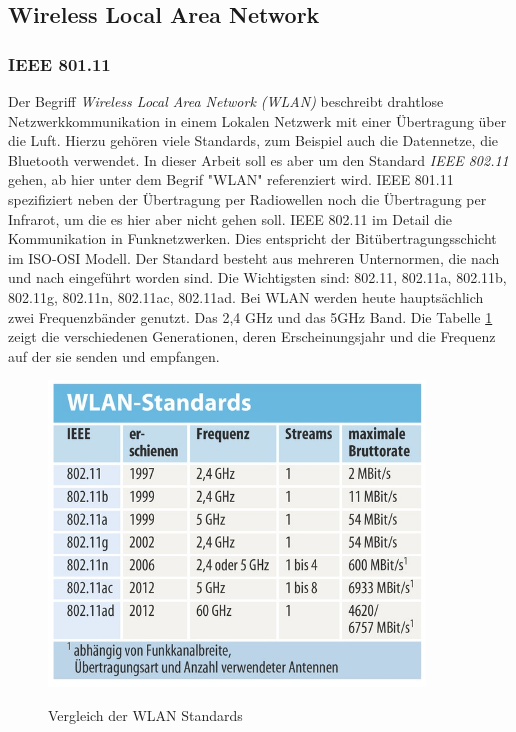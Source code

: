 \documentclass{scrartcl}%
\begin{document}
\subsection{Wireless Local Area Network}
\subsubsection{IEEE 801.11}
Der Begriff \textit{Wireless Local Area Network (WLAN)} beschreibt drahtlose Netzwerkkommunikation in einem Lokalen Netzwerk mit einer Übertragung über die Luft. Hierzu gehören viele Standards, zum Beispiel auch die Datennetze, die Bluetooth verwendet. In dieser Arbeit soll es aber um den Standard \textit{IEEE 802.11} gehen, ab hier unter dem Begrif "WLAN" referenziert wird. IEEE 801.11 spezifiziert neben der Übertragung per Radiowellen noch die Übertragung per Infrarot, um die es hier aber nicht gehen soll. IEEE 802.11 im Detail die Kommunikation in Funknetzwerken. Dies entspricht der Bitübertragungsschicht im ISO-OSI Modell. Der Standard besteht aus mehreren Unternormen, die nach und nach eingeführt worden sind. Die Wichtigsten sind:  802.11, 802.11a, 802.11b, 802.11g, 802.11n, 802.11ac, 802.11ad. Bei WLAN werden heute hauptsächlich zwei Frequenzbänder genutzt. Das 2,4 GHz und das 5GHz Band. Die Tabelle \ref{wlanStandards} zeigt die verschiedenen Generationen, deren Erscheinungsjahr und die Frequenz auf der sie senden und empfangen.

\begin{figure}[h]
	\centering
	\caption{Vergleich der WLAN Standards \cite{heiseWlan}}
	\includegraphics[width=10cm]{bilder/heise-de-wlan-standards}
	\newline
	\label{wlanStandards}
\end{figure}
\end{document}
